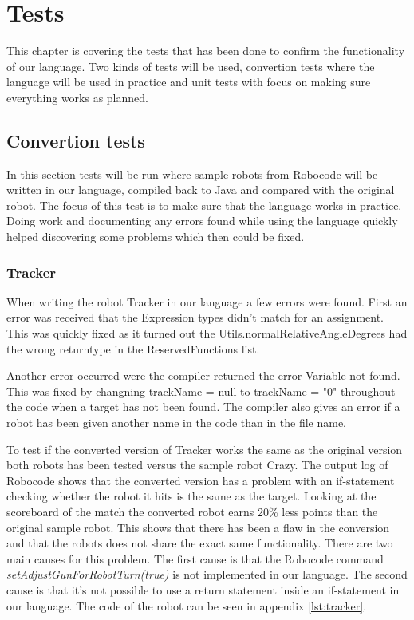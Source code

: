 \chapter{Tests}
This chapter is covering the tests that has been done to confirm the functionality of our language. Two kinds of tests will be used, convertion tests where the language will be used in practice and unit tests with focus on making sure everything works as planned.


\section{Convertion tests}
In this section tests will be run where sample robots from Robocode will be written in our language, compiled back to Java and compared with the original robot. The focus of this test is to make sure that the language works in practice. Doing work and documenting any errors found while using the language quickly helped discovering some problems which then could be fixed. 

\subsection{Tracker}
When writing the robot Tracker in our language a few errors were found. First an error was received that the Expression types didn't match for an assignment. This was quickly fixed as it turned out the Utils.normalRelativeAngleDegrees had the wrong returntype in the ReservedFunctions list.

Another error occurred were the compiler returned the error Variable not found. This was fixed by changning trackName = null to trackName = "0" throughout the code when a target has not been found. The compiler also gives an error if a robot has been given another name in the code than in the file name.

To test if the converted version of Tracker works the same as the original version both robots has been tested versus the sample robot Crazy. The output log of Robocode shows that the converted version has a problem with an if-statement checking whether the robot it hits is the same as the target. Looking at the scoreboard of the match the converted robot earns 20\% less points than the original sample robot. This shows that there has been a flaw in the conversion and that the robots does not share the exact same functionality.
There are two main causes for this problem. The first cause is that the Robocode command \emph{setAdjustGunForRobotTurn(true)} is not implemented in our language. The second cause is that it's not possible to use a return statement inside an if-statement in our language. 
The code of the robot can be seen in appendix \ref{lst:tracker}.


